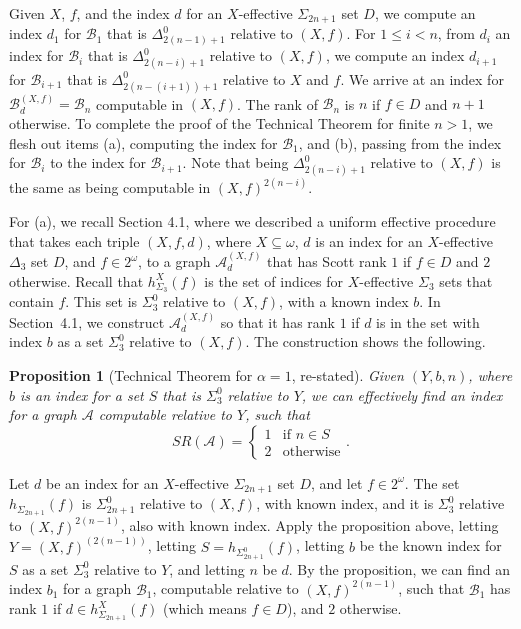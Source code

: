 \documentclass{article}
\newtheorem{prop}[thm]{Proposition}
\begin{document}
Given $X$, $f$, and the index $d$ for an $X$-effective $\Sigma_{2n+1}$ set $D$, we compute an index $d_1$ for $\mathcal{B}_1$ that is $\Delta^0_{2(n-1)+1}$ relative to $(X,f)$.
 For $1\leq i < n$, from $d_i$ an index for $\mathcal{B}_i$ that is $\Delta^0_{2(n-i)+1}$ relative to $(X,f)$, we compute an index $d_{i+1}$ for $\mathcal{B}_{i+1}$ that is $\Delta^0_{2(n-(i+1))+1}$ relative to $X$ and $f$.  
 We arrive at an index for $\mathcal{B}^{(X,f)}_d = \mathcal{B}_n$ computable in $(X,f)$.  The rank of $\mathcal{B}_n$ is $n$ if $f\in D$ and $n+1$ otherwise.  To complete the proof of the Technical Theorem for finite $n > 1$, we flesh out items (a), computing the index for $\mathcal{B}_1$,  and (b), passing from the index for $\mathcal{B}_i$ to the index for $\mathcal{B}_{i+1}$.  
Note that being $\Delta^0_{2(n-i)+1}$ relative to $(X,f)$ is the same as being computable in $(X,f)^{2(n-i)}$.   

\bigskip
\noindent
For (a), we recall Section 4.1, where we described a uniform effective procedure that takes each triple $(X,f,d)$, where $X\subseteq\omega$, $d$ is an index for an $X$-effective $\Delta_3$ set $D$, and $f\in 2^\omega$, to a graph $\mathcal{A}^{(X,f)}_d$ that has Scott rank $1$ if $f\in D$ and $2$ otherwise.  Recall that $h^X_{\Sigma_3}(f)$ is the set of indices for $X$-effective $\Sigma_3$ sets that contain $f$.  This set is $\Sigma^0_3$ relative to $(X,f)$, with a known index $b$.  In Section~4.1, we construct $\mathcal{A}^{(X,f)}_d$ so that it has rank $1$ if $d$ is in the set with index $b$ as a set $\Sigma^0_3$ relative to $(X,f)$.  The construction shows the following.

\begin{prop}[Technical Theorem for $\alpha = 1$, re-stated]  

Given $(Y,b,n)$, where $b$ is an index for a set $S$ that is $\Sigma^0_3$ relative to $Y$, we can effectively find an index for a graph $\mathcal{A}$ computable relative to $Y$, such that 
\[SR(\mathcal{A}) = \left\{\begin{array}{cc}
1 & \mbox{if $n\in S$}\\
2 & \mbox{otherwise}
\end{array}\right. .\] 

\end{prop}         

Let $d$ be an index for an $X$-effective $\Sigma_{2n+1}$ set $D$, and let $f\in 2^\omega$.  The set $h_{\Sigma_{2n+1}}(f)$ is $\Sigma^0_{2n+1}$ relative to $(X,f)$, with known index, and it is $\Sigma^0_3$ relative to $(X,f)^{2(n-1)}$, also with known index.  Apply the proposition above, letting $Y = (X,f)^{(2(n-1))}$, letting $S = h_{\Sigma^0_{2n+1}}(f)$, letting $b$ be the known index for $S$ as a set $\Sigma^0_3$ relative to $Y$, and letting $n$ be $d$.  By the proposition, we can find an index $b_1$ for a graph $\mathcal{B}_1$, computable relative to $(X,f)^{2(n-1)}$, such that $\mathcal{B}_1$ has rank $1$ if $d\in h^X_{\Sigma_{2n+1}}(f)$ (which means $f\in D$), and $2$ otherwise.     
\end{document}
